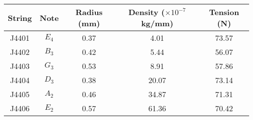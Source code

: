 \begin{tabular}{ccccc}
\toprule
String &   Note &  Radius (mm) &  Density ($\times 10^{-7}$ kg/mm) &  Tension (N) \\
\midrule
 J4401 &  $E_4$ &         0.37 &                              4.01 &        73.57 \\
 J4402 &  $B_3$ &         0.42 &                              5.44 &        56.07 \\
 J4403 &  $G_3$ &         0.53 &                              8.91 &        57.86 \\
 J4404 &  $D_3$ &         0.38 &                             20.07 &        73.14 \\
 J4405 &  $A_2$ &         0.46 &                             34.87 &        71.31 \\
 J4406 &  $E_2$ &         0.57 &                             61.36 &        70.42 \\
\bottomrule
\end{tabular}

